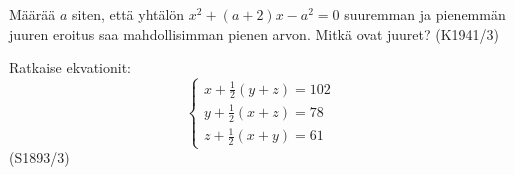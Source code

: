 \begin{tehtava}
Määrää $a$ siten, että yhtälön $x^2+(a+2)x-a^2=0$ suuremman ja pienemmän juuren eroitus saa mahdollisimman pienen arvon. Mitkä ovat juuret? (K1941/3)
\end{tehtava}


\begin{tehtava}
Ratkaise ekvationit:
\[
\left\{
\begin{aligned}
 x+\frac{1}{2}(y+z)=102    \\
 y+\frac{1}{2}(x+z)=78  \\
 z+\frac{1}{2}(x+y)=61
\end{aligned}
\right. 
\]
(S1893/3)
\end{tehtava}

